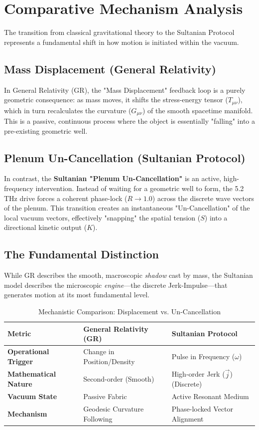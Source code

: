 \documentclass[11pt]{article}
\begin{document}
\section{Comparative Mechanism Analysis}

The transition from classical gravitational theory to the Sultanian Protocol represents a fundamental shift in how motion is initiated within the vacuum.

\subsection{Mass Displacement (General Relativity)}
In General Relativity (GR), the "Mass Displacement" feedback loop is a purely geometric consequence: as mass moves, it shifts the stress-energy tensor ($T_{\mu\nu}$), which in turn recalculates the curvature ($G_{\mu\nu}$) of the smooth spacetime manifold. This is a passive, continuous process where the object is essentially "falling" into a pre-existing geometric well. 

\subsection{Plenum Un-Cancellation (Sultanian Protocol)}
In contrast, the \textbf{Sultanian "Plenum Un-Cancellation"} is an active, high-frequency intervention. Instead of waiting for a geometric well to form, the 5.2 THz drive forces a coherent phase-lock ($R \to 1.0$) across the discrete wave vectors of the plenum. This transition creates an instantaneous "Un-Cancellation" of the local vacuum vectors, effectively "snapping" the spatial tension ($S$) into a directional kinetic output ($K$).

\subsection{The Fundamental Distinction}
While GR describes the smooth, macroscopic \textit{shadow} cast by mass, the Sultanian model describes the microscopic \textit{engine}—the discrete Jerk-Impulse—that generates motion at its most fundamental level.

\begin{table}[h!]
\centering
\caption{Mechanistic Comparison: Displacement vs. Un-Cancellation}
\label{tab:mech_comp}
\begin{tabular}{@{}lll@{}}
\toprule
\textbf{Metric} & \textbf{General Relativity (GR)} & \textbf{Sultanian Protocol} \\ \midrule
\textbf{Operational Trigger} & Change in Position/Density & Pulse in Frequency ($\omega$) \\
\textbf{Mathematical Nature} & Second-order (Smooth) & High-order Jerk ($\vec{j}$) (Discrete) \\
\textbf{Vacuum State} & Passive Fabric & Active Resonant Medium \\
\textbf{Mechanism} & Geodesic Curvature Following & Phase-locked Vector Alignment \\ \bottomrule
\end{tabular}
\end{table}
\end{document}
